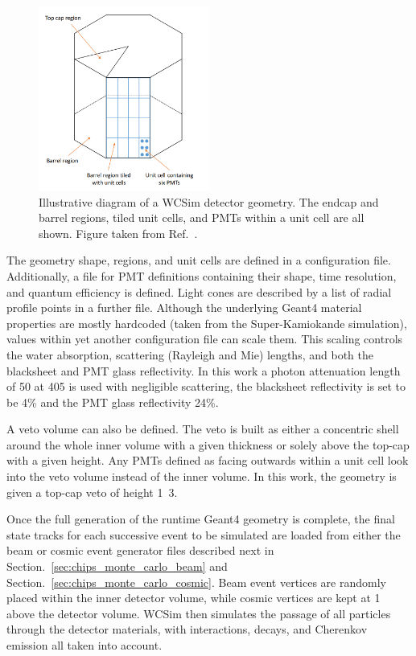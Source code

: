 \begin{figure} %
    \includegraphics[width=0.5\textwidth]{diagrams/4-chips/sim_geom.png}
    \caption[Illustrative diagram of a WCSim detector geometry]
    {Illustrative diagram of a WCSim detector geometry. The endcap and barrel regions, tiled unit
        cells, and PMTs within a unit cell are all shown. Figure taken from
        Ref.~\cite{blake2016}.}
    \label{fig:sim_geom}
\end{figure}

The geometry shape, regions, and unit cells are defined in a configuration file. Additionally, a
file for PMT definitions containing their shape, time resolution, and quantum efficiency is
defined. Light cones are described by a list of radial profile points in a further file. Although
the underlying Geant4 material properties are mostly hardcoded (taken from the Super-Kamiokande
simulation), values within yet another configuration file can scale them. This scaling controls
the water absorption, scattering (Rayleigh and Mie) lengths, and both the blacksheet and PMT glass
reflectivity. In this work a photon attenuation length of \unit{50}{} at
\unit{405}{} is used with negligible scattering, the blacksheet reflectivity is set to
be 4\% and the PMT glass reflectivity 24\%.

A veto volume can also be defined. The veto is built as either a concentric shell around the whole
inner volume with a given thickness or solely above the top-cap with a given height. Any PMTs
defined as facing outwards within a unit cell look into the veto volume instead of the inner
volume. In this work, the \chipsfive geometry is given a top-cap veto of height
\unit{1.3}{}.

Once the full generation of the runtime Geant4 geometry is complete, the final state tracks for
each successive event to be simulated are loaded from either the beam or cosmic event generator
files described next in Section.~\ref{sec:chips_monte_carlo_beam} and
Section.~\ref{sec:chips_monte_carlo_cosmic}. Beam event vertices are randomly placed within the
inner detector volume, while cosmic vertices are kept at \unit{1}{} above the detector
volume. WCSim then simulates the passage of all particles through the detector materials, with
interactions, decays, and Cherenkov emission all taken into account.

